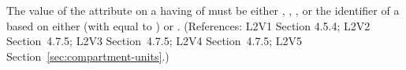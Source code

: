 The value of the  attribute on a \Compartment having
 of  must be either ,
, , or the identifier of a
\UnitDefinition based on either  (with  equal
to ) or .  (References: L2V1 Section 4.5.4;
L2V2 Section~4.7.5; L2V3 Section~4.7.5; L2V4 Section~4.7.5; L2V5 Section~\ref{sec:compartment-units}.)
